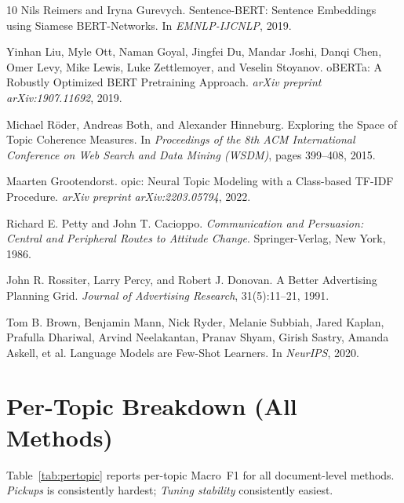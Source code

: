 \documentclass[11pt]{article}
\begin{document}
\begin{thebibliography}{10}
Nils Reimers and Iryna Gurevych.
\newblock Sentence-{BERT}: Sentence Embeddings using {S}iamese
  {BERT}-Networks.
\newblock In \textit{EMNLP-IJCNLP}, 2019.

Yinhan Liu, Myle Ott, Naman Goyal, Jingfei Du, Mandar Joshi,
Danqi Chen, Omer Levy, Mike Lewis, Luke Zettlemoyer, and Veselin Stoyanov.
o{BERT}a: A Robustly Optimized {BERT} Pretraining Approach.
\newblock \textit{arXiv preprint arXiv:1907.11692}, 2019.

Michael R{\"o}der, Andreas Both, and Alexander Hinneburg.
\newblock Exploring the Space of Topic Coherence Measures.
\newblock In \textit{Proceedings of the 8th ACM International Conference on
  Web Search and Data Mining (WSDM)}, pages 399--408, 2015.

Maarten Grootendorst.
opic: Neural Topic Modeling with a Class-based {TF-IDF}
  Procedure.
\newblock \textit{arXiv preprint arXiv:2203.05794}, 2022.

Richard E. Petty and John T. Cacioppo.
\newblock \textit{Communication and Persuasion: Central and Peripheral
  Routes to Attitude Change}.
\newblock Springer-Verlag, New York, 1986.

John R. Rossiter, Larry Percy, and Robert J. Donovan.
\newblock A Better Advertising Planning Grid.
\newblock \textit{Journal of Advertising Research}, 31(5):11--21, 1991.

Tom B. Brown, Benjamin Mann, Nick Ryder, Melanie Subbiah,
Jared Kaplan, Prafulla Dhariwal, Arvind Neelakantan, Pranav Shyam,
Girish Sastry, Amanda Askell, et al.
\newblock Language Models are Few-Shot Learners.
\newblock In \textit{NeurIPS}, 2020.

\end{thebibliography}

\appendix

\section{Per-Topic Breakdown (All Methods)}
\label{app:pertopic}

Table~\ref{tab:pertopic} reports per-topic Macro~F1 for all
document-level methods. \textit{Pickups} is consistently hardest;
\textit{Tuning stability} consistently easiest.
\end{document}
